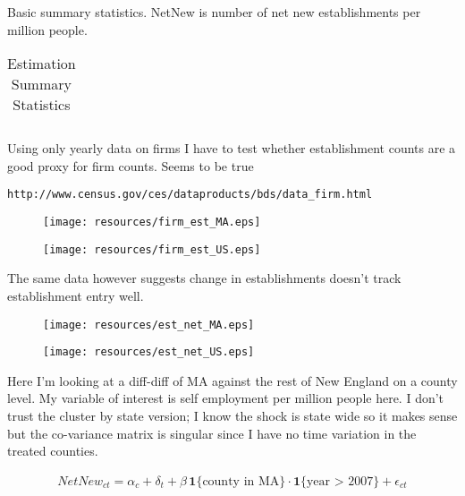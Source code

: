 \documentclass[12pt]{article}
\begin{document}
Basic summary statistics. NetNew is number of net new establishments per million people. 

\begin{flushleft}
\begin{table}[H]
	\centering
	\begin{tabular}{|p{6cm} | r | r| r| r|r|}
	\hline
	
	\hline
	\end{tabular}
	\caption{Estimation Summary Statistics}
\end{table}
\end{flushleft}

\pagebreak

Using only yearly data on firms I have to test whether establishment counts are a good proxy for firm counts. Seems to be true
\begin{verbatim}
http://www.census.gov/ces/dataproducts/bds/data_firm.html
\end{verbatim}

\begin{figure}[H]
	\centering
	\texttt{[image: resources/firm\_est\_MA.eps]}
\end{figure}

\begin{figure}[H]
	\centering
	\texttt{[image: resources/firm\_est\_US.eps]}
\end{figure}

\pagebreak

The same data however suggests change in establishments doesn't track establishment entry well.
\begin{figure}[H]
	\centering
	\texttt{[image: resources/est\_net\_MA.eps]}
\end{figure}

\begin{figure}[H]
	\centering
	\texttt{[image: resources/est\_net\_US.eps]}
\end{figure}

\pagebreak

Here I'm looking at a diff-diff of MA against the rest of New England on a county level. My variable of interest is self employment per million people here. I don't trust the cluster by state version; I know the shock is state wide so it makes sense but the co-variance matrix is singular since I have no time variation in the treated counties. 

\begin{align}
NetNew_{ct} = \alpha_c + \delta_t + \beta \, \mathbf{1}\{\text{county in MA}\} \cdot \mathbf{1}\{\text{year > 2007}\} + \epsilon_{ct}
\end{align}
\end{document}
